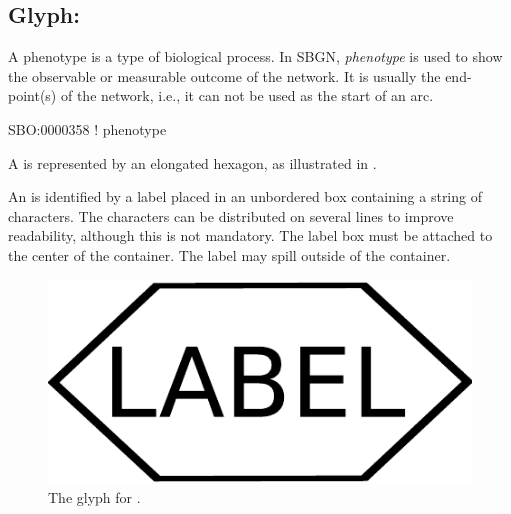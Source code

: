 \subsection{Glyph: }
\label{sec:af:phenotype}

A phenotype is a type of biological process.  In SBGN, \emph{phenotype} is used to show the observable or measurable outcome of the network.  It is usually the end-point(s) of the network, i.e., it can not be used as the start of an arc.

\begin{glyphDescription}

\glyphSboTerm
SBO:0000358 ! phenotype

\glyphContainer A  is represented by an elongated hexagon, as illustrated in .

\glyphLabel An  is identified by a label placed in an unbordered box containing a string of characters.  The characters can be distributed on several lines to improve readability, although this is not mandatory.  The label box must be attached to the center of the  container.  The label may spill outside of the container.

\end{glyphDescription}

\begin{figure}[H]
  \centering
  \includegraphics[scale = 0.4]{images/build/phenotype.pdf}
  \caption{The \AF glyph for .}
  \label{fig:af:phenotype}
\end{figure}
